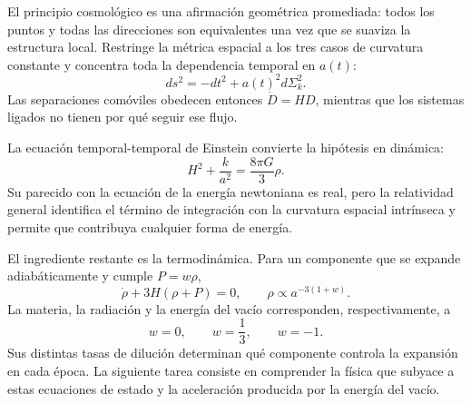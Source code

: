 El principio cosmológico es una afirmación geométrica promediada: todos los puntos y todas las direcciones son equivalentes una vez que se suaviza la estructura local. Restringe la métrica espacial a los tres casos de curvatura constante y concentra toda la dependencia temporal en \(a(t)\):
\begin{equation}
ds^2=-dt^2+a(t)^2d\Sigma_k^2.
\end{equation}
Las separaciones comóviles obedecen entonces \(\dot D=HD\), mientras que los sistemas ligados no tienen por qué seguir ese flujo.

La ecuación temporal-temporal de Einstein convierte la hipótesis en dinámica:
\begin{equation}
H^2+\frac{k}{a^2}=\frac{8\pi G}{3}\rho.
\end{equation}
Su parecido con la ecuación de la energía newtoniana es real, pero la relatividad general identifica el término de integración con la curvatura espacial intrínseca y permite que contribuya cualquier forma de energía.

El ingrediente restante es la termodinámica. Para un componente que se expande adiabáticamente y cumple \(P=w\rho\),
\begin{equation}
\dot\rho+3H(\rho+P)=0,
\qquad
\rho\propto a^{-3(1+w)}.
\end{equation}
La materia, la radiación y la energía del vacío corresponden, respectivamente, a
\begin{equation}
w=0,\qquad w=\frac13,\qquad w=-1.
\end{equation}
Sus distintas tasas de dilución determinan qué componente controla la expansión en cada época. La siguiente tarea consiste en comprender la física que subyace a estas ecuaciones de estado y la aceleración producida por la energía del vacío.
